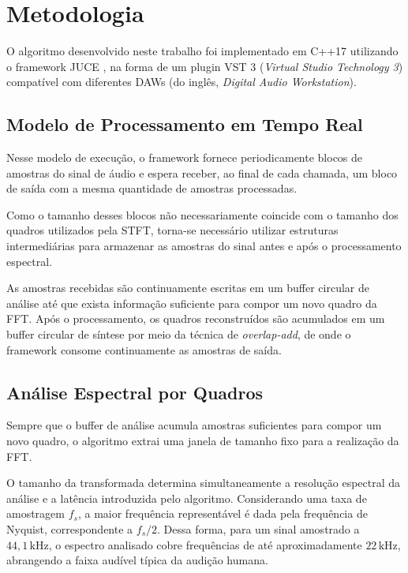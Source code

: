 \section{Metodologia}\label{sec:metodologia}

O algoritmo desenvolvido neste trabalho foi implementado em C++17 utilizando o framework JUCE \cite{juce}, na forma de um plugin VST 3 (\textit{Virtual Studio Technology 3}) compatível com diferentes DAWs (do inglês, \textit{Digital Audio Workstation}).

\subsection{Modelo de Processamento em Tempo Real}

Nesse modelo de execução, o framework fornece periodicamente blocos de amostras do sinal de áudio e espera receber, ao final de cada chamada, um bloco de saída com a mesma quantidade de amostras processadas.

Como o tamanho desses blocos não necessariamente coincide com o tamanho dos quadros utilizados pela STFT, torna-se necessário utilizar estruturas intermediárias para armazenar as amostras do sinal antes e após o processamento espectral.

As amostras recebidas são continuamente escritas em um buffer circular de análise até que exista informação suficiente para compor um novo quadro da FFT. Após o processamento, os quadros reconstruídos são acumulados em um buffer circular de síntese por meio da técnica de \textit{overlap-add}, de onde o framework consome continuamente as amostras de saída.

\subsection{Análise Espectral por Quadros}

Sempre que o buffer de análise acumula amostras suficientes para compor um novo quadro, o algoritmo extrai uma janela de tamanho fixo para a realização da FFT.

O tamanho da transformada determina simultaneamente a resolução espectral da análise e a latência introduzida pelo algoritmo. Considerando uma taxa de amostragem \(f_s\), a maior frequência representável é dada pela frequência de Nyquist, correspondente a \(f_s/2\). Dessa forma, para um sinal amostrado a \(44{,}1\,\mathrm{kHz}\), o espectro analisado cobre frequências de até aproximadamente \(22\,\mathrm{kHz}\), abrangendo a faixa audível típica da audição humana.

